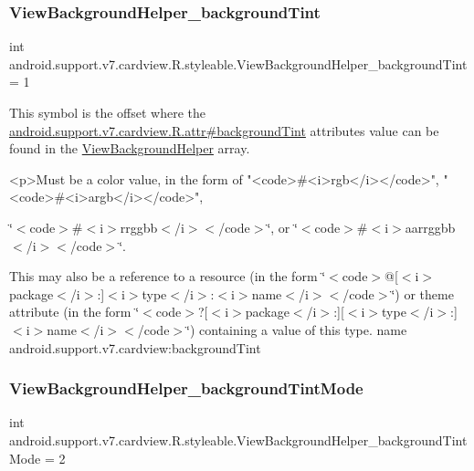 \subsubsection{\texorpdfstring{View\+Background\+Helper\+\_\+background\+Tint}{ViewBackgroundHelper\_backgroundTint}}
{\footnotesize\ttfamily int android.\+support.\+v7.\+cardview.\+R.\+styleable.\+View\+Background\+Helper\+\_\+background\+Tint = 1\hspace{0.3cm}{\ttfamily [static]}}

This symbol is the offset where the \hyperlink{classandroid_1_1support_1_1v7_1_1cardview_1_1R_1_1attr_ab937a9e918e0058bdb22175c79c80b62}{android.\+support.\+v7.\+cardview.\+R.\+attr\#background\+Tint} attribute\textquotesingle{}s value can be found in the \hyperlink{classandroid_1_1support_1_1v7_1_1cardview_1_1R_1_1styleable_a5b548c410f0942ef83e14ce4020235ca}{View\+Background\+Helper} array.

\begin{DoxyVerb}      <p>Must be a color value, in the form of "<code>#<i>rgb</i></code>", "<code>#<i>argb</i></code>",
\end{DoxyVerb}
 \char`\"{}$<$code$>$\#$<$i$>$rrggbb$<$/i$>$$<$/code$>$\char`\"{}, or \char`\"{}$<$code$>$\#$<$i$>$aarrggbb$<$/i$>$$<$/code$>$\char`\"{}. 

This may also be a reference to a resource (in the form \char`\"{}$<$code$>$@\mbox{[}$<$i$>$package$<$/i$>$\+:\mbox{]}$<$i$>$type$<$/i$>$\+:$<$i$>$name$<$/i$>$$<$/code$>$\char`\"{}) or theme attribute (in the form \char`\"{}$<$code$>$?\mbox{[}$<$i$>$package$<$/i$>$\+:\mbox{]}\mbox{[}$<$i$>$type$<$/i$>$\+:\mbox{]}$<$i$>$name$<$/i$>$$<$/code$>$\char`\"{}) containing a value of this type.  name android.\+support.\+v7.\+cardview\+:background\+Tint \mbox{\label{classandroid_1_1support_1_1v7_1_1cardview_1_1R_1_1styleable_a79e46c7414583bac85ce50861d5c8ad0}} 
\subsubsection{\texorpdfstring{View\+Background\+Helper\+\_\+background\+Tint\+Mode}{ViewBackgroundHelper\_backgroundTintMode}}
{\footnotesize\ttfamily int android.\+support.\+v7.\+cardview.\+R.\+styleable.\+View\+Background\+Helper\+\_\+background\+Tint\+Mode = 2\hspace{0.3cm}{\ttfamily [static]}}

